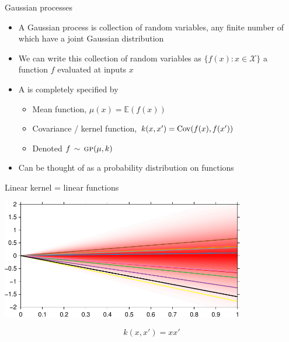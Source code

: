 \begin{frame}{Gaussian processes}
  \begin{itemize}
    \item A Gaussian process is collection of random variables, any finite number of which have a joint Gaussian distribution
    \pause
    \vspace{\baselineskip}
    \item We can write this collection of random variables as $\{f(x) : x \in \mathcal{X}\}$ \ie a function $f$ evaluated at inputs $x$
    \pause
    \vspace{\baselineskip}
    \item A \gp{} is completely specified by
    \begin{itemize}
      \item Mean function, $\mu(x)=\mathbb{E}(f(x))$
      \item Covariance / kernel function, $k(x,x') = \operatorname{Cov}(f(x),f(x'))$
      \item Denoted $f \,\sim\, {\textsc{gp}}{}(\mu,k)$
    \end{itemize}
    \vspace{\baselineskip}
    \pause
    \item Can be thought of as a probability distribution on functions
  \end{itemize}
\end{frame}

\begin{frame}{Linear kernel = linear functions}
  \begin{center}
    \includegraphics[width=0.8\textwidth]{figures/lin_reg/prior}
  \end{center}
  \begin{equation*}
    k(x, x') = xx'
  \end{equation*}
\end{frame}

